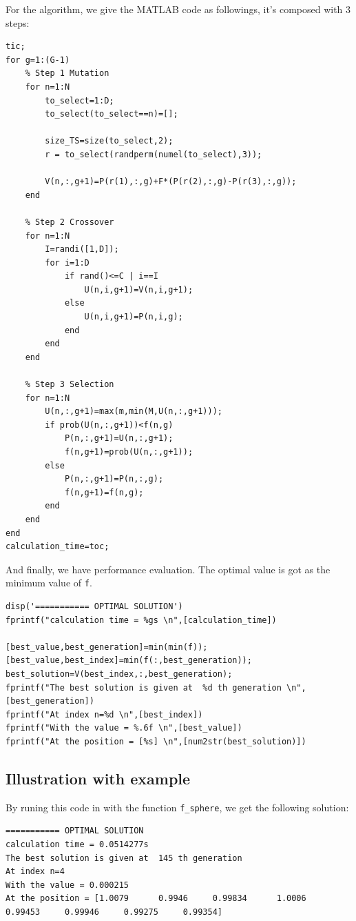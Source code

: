 \documentclass{CSArticle}[english]
\begin{document}
For the algorithm, we give the MATLAB code as followings, it's composed with 3 steps:\par
\begin{lstlisting}[style=MATLAB]
%% Iteration loop
tic;
for g=1:(G-1)
    % Step 1 Mutation
    for n=1:N
        to_select=1:D;
        to_select(to_select==n)=[];
   
        size_TS=size(to_select,2);
        r = to_select(randperm(numel(to_select),3));
        
        V(n,:,g+1)=P(r(1),:,g)+F*(P(r(2),:,g)-P(r(3),:,g));
    end
    
    % Step 2 Crossover
    for n=1:N
        I=randi([1,D]);
        for i=1:D
            if rand()<=C | i==I
                U(n,i,g+1)=V(n,i,g+1);
            else
                U(n,i,g+1)=P(n,i,g);
            end
        end
    end
  
    % Step 3 Selection
    for n=1:N
        U(n,:,g+1)=max(m,min(M,U(n,:,g+1)));
        if prob(U(n,:,g+1))<f(n,g)
            P(n,:,g+1)=U(n,:,g+1);
            f(n,g+1)=prob(U(n,:,g+1));
        else
            P(n,:,g+1)=P(n,:,g);
            f(n,g+1)=f(n,g);
        end
    end
end
calculation_time=toc;
\end{lstlisting}
And finally, we have performance evaluation. The optimal value is got as the minimum value of \verb|f|. 
\begin{lstlisting}[style=MATLAB]
%% Key results at the end of the optimisation
disp('=========== OPTIMAL SOLUTION')
fprintf("calculation time = %gs \n",[calculation_time])

[best_value,best_generation]=min(min(f));
[best_value,best_index]=min(f(:,best_generation));
best_solution=V(best_index,:,best_generation);
fprintf("The best solution is given at  %d th generation \n",[best_generation])
fprintf("At index n=%d \n",[best_index])
fprintf("With the value = %.6f \n",[best_value])
fprintf("At the position = [%s] \n",[num2str(best_solution)])

\end{lstlisting}

\subsection{Illustration with example}
By runing this code in with the function \verb|f_sphere|, we get the following solution:
\begin{lstlisting}[style=RESULT]
=========== OPTIMAL SOLUTION
calculation time = 0.0514277s 
The best solution is given at  145 th generation 
At index n=4 
With the value = 0.000215 
At the position = [1.0079      0.9946     0.99834      1.0006     0.99453     0.99946     0.99275     0.99354] 
\end{lstlisting}
\end{document}
